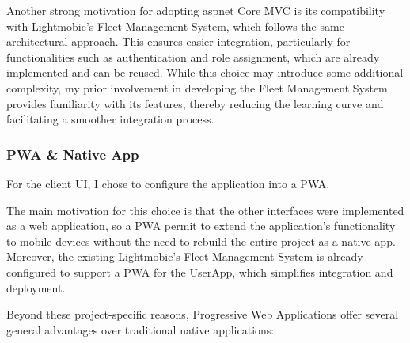 Another strong motivation for adopting \ac{aspnet} Core \ac{MVC} is its compatibility with Lightmobie's Fleet Management System, which follows the same architectural approach. This ensures easier integration, particularly for functionalities such as authentication and role assignment, which are already implemented and can be reused. While this choice may introduce some additional complexity, my prior involvement in developing the Fleet Management System provides familiarity with its features, thereby reducing the learning curve and facilitating a smoother integration process.
  
\subsubsection{\ac{PWA} \& Native App}
For the client \ac{UI}, I chose to configure the application into a \ac{PWA}.  

The main motivation for this choice is that the other interfaces were implemented as a web application, so a \ac{PWA} permit to extend the application's functionality to mobile devices without the need to rebuild the entire project as a native app. Moreover, the existing Lightmobie's Fleet Management System is already configured to support a \ac{PWA} for the UserApp, which simplifies integration and deployment.

Beyond these project-specific reasons, Progressive Web Applications offer several general advantages over traditional native applications:

